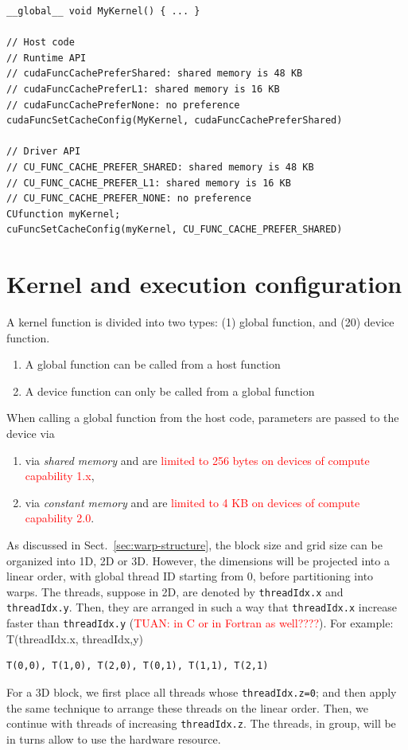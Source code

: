\begin{lstlisting}
__global__ void MyKernel() { ... } 

// Host code 
// Runtime API 
// cudaFuncCachePreferShared: shared memory is 48 KB 
// cudaFuncCachePreferL1: shared memory is 16 KB 
// cudaFuncCachePreferNone: no preference
cudaFuncSetCacheConfig(MyKernel, cudaFuncCachePreferShared) 

// Driver API 
// CU_FUNC_CACHE_PREFER_SHARED: shared memory is 48 KB 
// CU_FUNC_CACHE_PREFER_L1: shared memory is 16 KB 
// CU_FUNC_CACHE_PREFER_NONE: no preference 
CUfunction myKernel; 
cuFuncSetCacheConfig(myKernel, CU_FUNC_CACHE_PREFER_SHARED)
\end{lstlisting}



\section{Kernel and execution configuration}
\label{sec:kern-exec-conf}

A kernel function is divided into two types: (1) global function, and
(20) device function.

\begin{enumerate}
\item A global function can be called from a host function
\item A device function can only be called from a global function
\end{enumerate}

When calling a global function from the host code, parameters are
passed to the device via
\begin{enumerate}
\item via {\it shared memory} and are
  \textcolor{red}{limited to 256 bytes on devices of compute
    capability 1.x},
\item via {\it constant memory} and are
  \textcolor{red}{ limited to 4 KB on devices of compute capability
    2.0}.
\end{enumerate}



As discussed in Sect.~\ref{sec:warp-structure}, the block size and
grid size can be organized into 1D, 2D or 3D. However, the dimensions
will be projected into a linear order, with global thread ID starting
from 0, before partitioning into warps. The threads, suppose in 2D,
are denoted by \verb!threadIdx.x!  and \verb!threadIdx.y!. Then, they
are arranged in such a way that \verb!threadIdx.x! increase faster
than \verb!threadIdx.y!
(\textcolor{red}{TUAN: in C or in Fortran as well????}). For example:
T(threadIdx.x, threadIdx,y)
\begin{verbatim}
T(0,0), T(1,0), T(2,0), T(0,1), T(1,1), T(2,1)
\end{verbatim}
For a 3D block, we first place all threads whose \verb!threadIdx.z=0!;
and then apply the same technique to arrange these threads on the
linear order. Then, we continue with threads of increasing
\verb!threadIdx.z!.  The threads, in group, will be in turns allow to
use the hardware resource.

